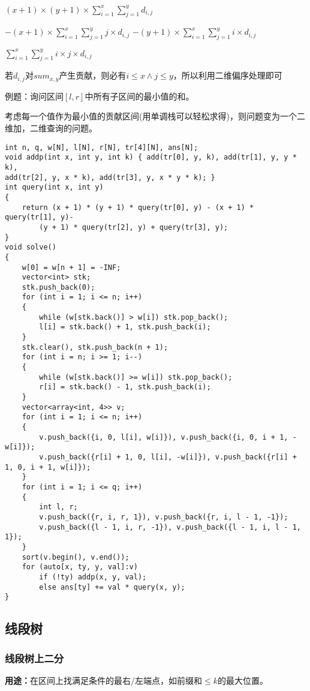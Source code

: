 \documentclass[a4paper, fontset=none]{ctexart}
\begin{document}
$(x+1)\times (y+1)\times \sum_{i=1}^x\sum_{j=1}^y d_{i, j}$

$-(x+1)\times \sum_{i=1}^x\sum_{j=1}^y j\times d_{i, j}$
$-(y+1)\times \sum_{i=1}^x\sum_{j=1}^y i\times d_{i, j}$

$\sum_{i=1}^x\sum_{j=1}^y i\times j\times d_{i, j}$

若$d_{i, j}$对$sum_{x, y}$产生贡献，则必有$i\leqslant x\land j\leqslant y$，所以利用二维偏序处理即可

例题：询问区间$[l, r]$中所有子区间的最小值的和。

考虑每一个值作为最小值的贡献区间(用单调栈可以轻松求得)，则问题变为一个二维加，二维查询的问题。

\begin{verbatim}
int n, q, w[N], l[N], r[N], tr[4][N], ans[N];
void addp(int x, int y, int k) { add(tr[0], y, k), add(tr[1], y, y * k),
add(tr[2], y, x * k), add(tr[3], y, x * y * k); }
int query(int x, int y)
{
    return (x + 1) * (y + 1) * query(tr[0], y) - (x + 1) * query(tr[1], y)-
        (y + 1) * query(tr[2], y) + query(tr[3], y);
}
void solve()
{
    w[0] = w[n + 1] = -INF;
    vector<int> stk;
    stk.push_back(0);
    for (int i = 1; i <= n; i++)
    {
        while (w[stk.back()] > w[i]) stk.pop_back();
        l[i] = stk.back() + 1, stk.push_back(i);
    }
    stk.clear(), stk.push_back(n + 1);
    for (int i = n; i >= 1; i--)
    {
        while (w[stk.back()] >= w[i]) stk.pop_back();
        r[i] = stk.back() - 1, stk.push_back(i);
    }
    vector<array<int, 4>> v;
    for (int i = 1; i <= n; i++)
    {
        v.push_back({i, 0, l[i], w[i]}), v.push_back({i, 0, i + 1, -w[i]});
        v.push_back({r[i] + 1, 0, l[i], -w[i]}), v.push_back({r[i] + 1, 0, i + 1, w[i]});
    }
    for (int i = 1; i <= q; i++)
    {
        int l, r;
        v.push_back({r, i, r, 1}), v.push_back({r, i, l - 1, -1});
        v.push_back({l - 1, i, r, -1}), v.push_back({l - 1, i, l - 1, 1});
    }
    sort(v.begin(), v.end());
    for (auto[x, ty, y, val]:v)
        if (!ty) addp(x, y, val);
        else ans[ty] += val * query(x, y);
}
\end{verbatim}
\subsection{线段树}
\subsubsection{线段树上二分}
\textbf{用途：}在区间上找满足条件的最右/左端点，如前缀和$\leq k$的最大位置。
\end{document}

